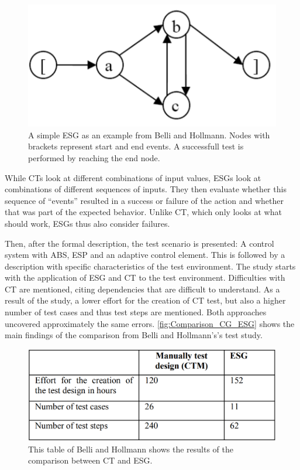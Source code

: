 \begin{figure}[H]
\centering
\includegraphics[scale=0.6]{../../individual/groeger/images/ESG_Beispiel.png} 
\caption{A simple ESG as an example from Belli and Hollmann. Nodes with brackets represent start and end events. A successfull test is performed by reaching the end node. \cite{Belli2009}}
\label{fig:Approach2_CT}
\end{figure}

While CTs look at different combinations of input values, ESGs look at combinations of different sequences of inputs. They then evaluate whether this sequence of \enquote{events} resulted in a success or failure of the action and whether that was part of the expected behavior. Unlike CT, which only looks at what should work, ESGs thus also consider failures.

Then, after the formal description, the test scenario is presented: A control system with ABS, ESP and an adaptive control element. This is followed by a description with specific characteristics of the test environment. The study starts with the application of ESG and CT to the test environment. Difficulties with CT are mentioned, citing dependencies that are difficult to understand. As a result of the study, a lower effort for the creation of CT test, but also a higher number of test cases and thus test steps are mentioned. Both approaches uncovered approximately the same errors. \autoref{fig:Comparison_CG_ESG} shows the main findings of the comparison from Belli and Hollmann's\cite{Belli2009}'s test study.

\begin{figure}[H]
\centering
\includegraphics[scale=0.4]{../../individual/groeger/images/Comparison_CG_ESG.png} 
\caption{This table of Belli and Hollmann\cite{Belli2009} shows the results of the comparison between CT and ESG.}
\label{fig:Comparison_CG_ESG}
\end{figure}

